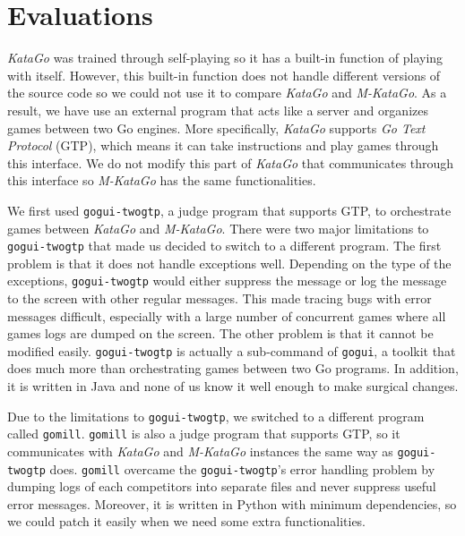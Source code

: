 \documentclass{article}
\newcommand{\katago}{\emph{KataGo}\xspace}
\newcommand{\mkatago}{\emph{M-KataGo}\xspace}
\begin{document}
      \section{Evaluations}

      \katago was trained through self-playing so it has a built-in function of playing with itself.
      However, this built-in function does not handle different versions of the source code so we could not use it to compare \katago and \mkatago.
      As a result, we have use an external program that acts like a server and organizes games between two Go engines.
      More specifically, \katago supports \textit{Go Text Protocol} (GTP), which means it can take instructions and play games through this interface.
      We do not modify this part of \katago that communicates through this interface so \mkatago has the same functionalities.

      We first used \texttt{gogui-twogtp}, a judge program that supports GTP, to orchestrate games between \katago and \mkatago.
      There were two major limitations to \texttt{gogui-twogtp} that made us decided to switch to a different program.
      The first problem is that it does not handle exceptions well.
      Depending on the type of the exceptions, \texttt{gogui-twogtp} would either suppress the message or log the message to the screen with other regular messages.
      This made tracing bugs with error messages difficult, especially with a large number of concurrent games where all games logs are dumped on the screen.
      The other problem is that it cannot be modified easily.
      \texttt{gogui-twogtp} is actually a sub-command of \texttt{gogui}, a toolkit that does much more than orchestrating games between two Go programs.
      In addition, it is written in Java and none of us know it well enough to make surgical changes.

      Due to the limitations to \texttt{gogui-twogtp}, we switched to a different program called \texttt{gomill}.
      \texttt{gomill} is also a judge program that supports GTP, so it communicates with \katago and \mkatago instances the same way as \texttt{gogui-twogtp} does.
      \texttt{gomill} overcame the \texttt{gogui-twogtp}'s error handling problem by dumping logs of each competitors into separate files and never suppress useful error messages.
      Moreover, it is written in Python with minimum dependencies, so we could patch it easily when we need some extra functionalities.
\end{document}
